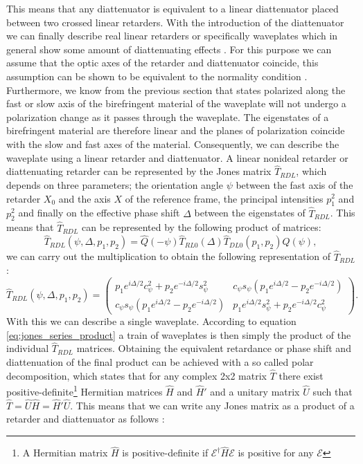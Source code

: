 This means that any diattenuator is equivalent to a linear diattenuator placed between two crossed linear retarders. With the introduction of the diattenuator we can finally describe real linear retarders or specifically waveplates which in general show some amount of diattenuating effects \cite{D.CLARKE1971PolarizedMeasurement}. For this purpose we can assume that the optic axes of the retarder and diattenuator coincide, this assumption can be shown to be equivalent to the normality condition \cite{Bass1995HandbookOptics}. Furthermore, we know from the previous section that states polarized along the fast or slow axis of the birefringent material of the waveplate will not undergo a polarization change as it passes through the waveplate. The eigenstates of a birefringent material are therefore linear and the planes of polarization coincide with the slow and fast axes of the material. Consequently, we can describe the waveplate using a linear retarder and diattenuator. A linear nonideal retarder or diattenuating retarder can be represented by the Jones matrix $\hat{T}_{RDL}$, which depends on three parameters; the orientation angle $\psi$ between the fast axis of the retarder $X_0$ and the axis $X$ of the reference frame, the principal intensities $p_1^2$ and $p_2^2$ and finally on the effective phase shift $\Delta$ between the eigenstates of $\hat{T}_{RDL}$. This means that $\hat{T}_{RDL}$ can be represented by the following product of matrices:
\begin{equation}
    \hat{T}_{RDL}(\psi, \Delta, p_1, p_2) = \hat{Q}(-\psi)\hat{T}_{RL0}(\Delta)\hat{T}_{DL0}(p_1, p_2)\hat{Q}(\psi),
\end{equation}
we can carry out the multiplication to obtain the following representation of $\hat{T}_{RDL}$:
\begin{equation}
    \hat{T}_{RDL}(\psi, \Delta, p_1, p_2) = 
    \begin{pmatrix} 
    p_1e^{i\Delta/2}c_{\psi}^2+p_2e^{-i\Delta/2}s_{\psi}^2 & c_{\psi}s_{\psi}\left(p_1e^{i\Delta/2}-p_2e^{-i\Delta/2}\right) \\
    c_{\psi}s_{\psi}\left(p_1e^{i\Delta/2}-p_2e^{-i\Delta/2}\right) & 
    p_1e^{i\Delta/2}s_{\psi}^2+p_2e^{-i\Delta/2}c_{\psi}^2
    \end{pmatrix}.
\end{equation}
With this we can describe a single waveplate. According to equation \ref{eq:jones_series_product} a train of waveplates is then simply the product of the individual $\hat{T}_{RDL}$ matrices. Obtaining the equivalent retardance or phase shift and diattenuation of the final product can be achieved with a so called polar decomposition, which states that for any complex 2x2 matrix $\hat{T}$ there exist positive-definite\footnote{A Hermitian matrix $\hat{H}$ is positive-definite if $\bm{\mathcal{E}}^{\dagger}\hat{H}\bm{\mathcal{E}}$ is positive for any $\bm{\mathcal{E}}$} Hermitian matrices $\hat{H}$ and $\hat{H}'$ and a unitary matrix $\hat{U}$ such that $\hat{T}=\hat{U}\hat{H}=\hat{H}'\hat{U}$. This means that we can write any Jones matrix as a product of a retarder and diattenuator as follows \cite{GilPerez2017PolarizedApproach}:
